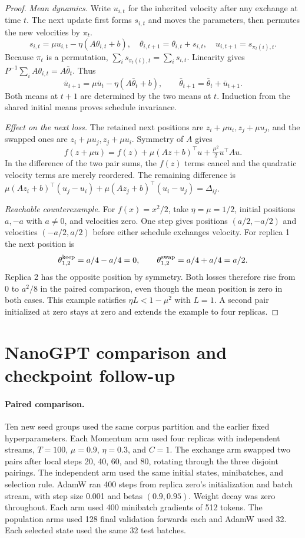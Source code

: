\documentclass[10pt,letterpaper]{article}
\begin{document}
\begin{proof}
\textit{Mean dynamics.} Write \(u_{i,t}\) for the inherited velocity after any exchange at time \(t\). The next update first forms \(s_{i,t}\) and moves the parameters, then permutes the new velocities by \(\pi_t\).
\[
s_{i,t}=\mu u_{i,t}-\eta(A\theta_{i,t}+b),\quad
\theta_{i,t+1}=\theta_{i,t}+s_{i,t},\quad u_{i,t+1}=s_{\pi_t(i),t}.
\]
Because \(\pi_t\) is a permutation, \(\sum_i s_{\pi_t(i),t}=\sum_i s_{i,t}\). Linearity gives \(P^{-1}\sum_i A\theta_{i,t}=A\bar\theta_t\). Thus
\[
\bar u_{t+1}=\mu\bar u_t-\eta(A\bar\theta_t+b),\qquad
\bar\theta_{t+1}=\bar\theta_t+\bar u_{t+1}.
\]
Both means at \(t+1\) are determined by the two means at \(t\). Induction from the shared initial means proves schedule invariance.

\textit{Effect on the next loss.} The retained next positions are \(z_i+\mu u_i,z_j+\mu u_j\), and the swapped ones are \(z_i+\mu u_j,z_j+\mu u_i\). Symmetry of \(A\) gives
\[
 f(z+\mu u)=f(z)+\mu(Az+b)^\top u+\tfrac{\mu^2}{2}u^\top A u .
\]
In the difference of the two pair sums, the \(f(z)\) terms cancel and the quadratic velocity terms are merely reordered. The remaining difference is
\(\mu(Az_i+b)^\top(u_j-u_i)+\mu(Az_j+b)^\top(u_i-u_j)=\Delta_{ij}\).

\textit{Reachable counterexample.} For \(f(x)=x^2/2\), take \(\eta=\mu=1/2\), initial positions \(a,-a\) with \(a\ne0\), and velocities zero. One step gives positions \((a/2,-a/2)\) and velocities \((-a/2,a/2)\) before either schedule exchanges velocity. For replica 1 the next position is
\[
\theta_{1,2}^{\rm keep}=a/4-a/4=0,\qquad
\theta_{1,2}^{\rm swap}=a/4+a/4=a/2.
\]
Replica 2 has the opposite position by symmetry. Both losses therefore rise from \(0\) to \(a^2/8\) in the paired comparison, even though the mean position is zero in both cases. This example satisfies \(\eta L<1-\mu^2\) with \(L=1\). A second pair initialized at zero stays at zero and extends the example to four replicas.
\end{proof}

\clearpage
\section{NanoGPT comparison and checkpoint follow-up}
\label{sec:evaluation}

\paragraph{Paired comparison.}
Ten new seed groups used the same corpus partition and the earlier fixed hyperparameters. Each Momentum arm used four replicas with independent streams, \(T=100\), \(\mu=0.9\), \(\eta=0.3\), and \(C=1\). The exchange arm swapped two pairs after local steps 20, 40, 60, and 80, rotating through the three disjoint pairings. The independent arm used the same initial states, minibatches, and selection rule. AdamW ran 400 steps from replica zero's initialization and batch stream, with step size 0.001 and betas \((0.9,0.95)\). Weight decay was zero throughout. Each arm used 400 minibatch gradients of 512 tokens. The population arms used 128 final validation forwards each and AdamW used 32. Each selected state used the same 32 test batches.
\end{document}
